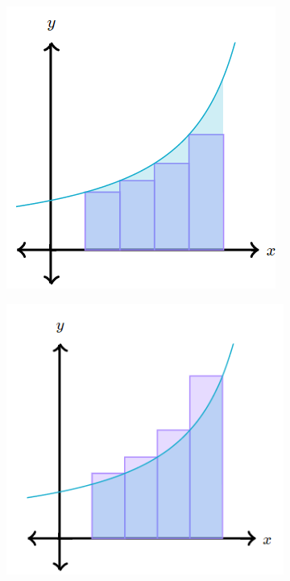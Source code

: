         \begin{figure}[hbt!]
            \centering
            \begin{subfigure}[b]{.45\textwidth}
                \includegraphics[scale=0.8]{Resources/Unit4Integration/Riemann_Left}
            \end{subfigure}
            \begin{subfigure}[b]{.45\textwidth}
                \includegraphics[scale=0.8]{Resources/Unit4Integration/Riemann_Right}
            \end{subfigure}
        \end{figure}

